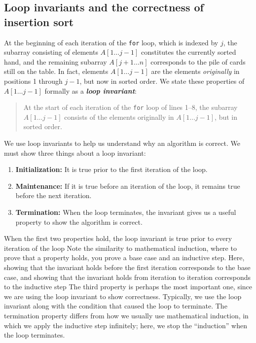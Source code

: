 \documentclass{report}
\begin{document}
    \subsection{Loop invariants and the correctness of insertion sort}
    \bigbreak \noindent 
    At the beginning of each iteration of the \texttt{for} loop, which is indexed by \( j \), the subarray consisting of elements \( A[1 \dots j - 1] \) constitutes the currently sorted hand, and the remaining subarray \( A[j + 1 \dots n] \) corresponds to the pile of cards still on the table. In fact, elements \( A[1 \dots j - 1] \) are the elements \textit{originally} in positions 1 through \( j - 1 \), but now in sorted order. We state these properties of \( A[1 \dots j - 1] \) formally as a \textit{\textbf{loop invariant}}:
    \bigbreak \noindent 
    \begin{quote}
        At the start of each iteration of the \texttt{for} loop of lines 1--8, the subarray \( A[1 \dots j - 1] \) consists of the elements originally in \( A[1 \dots j - 1] \), but in sorted order.
    \end{quote}
    \bigbreak \noindent 
    We use loop invariants to help us understand why an algorithm is correct. We must show three things about a loop invariant:
    \begin{enumerate}
        \item \textbf{Initialization:} It is true prior to the first iteration of the loop.
        \item \textbf{Maintenance:} If it is true before an iteration of the loop, it remains true before the next iteration.
        \item \textbf{Termination:} When the loop terminates, the invariant gives us a useful property to show the algorithm is correct.
    \end{enumerate}
    \bigbreak \noindent 
    When the first two properties hold, the loop invariant is true prior to every iteration of the loop
    \bigbreak \noindent 
    Note the similarity to mathematical induction, where to prove that a property holds, you prove a base case and an inductive step. Here, showing that the invariant holds before the first iteration corresponds to the base case, and showing that the invariant holds from iteration to iteration corresponds to the inductive step
    \bigbreak \noindent 
    The third property is perhaps the most important one, since we are using the loop invariant to show correctness. Typically, we use the loop invariant along with the condition that caused the loop to terminate. The termination property differs from how we usually use mathematical induction, in which we apply the inductive step infinitely; here, we stop the “induction” when the loop terminates.
\end{document}
